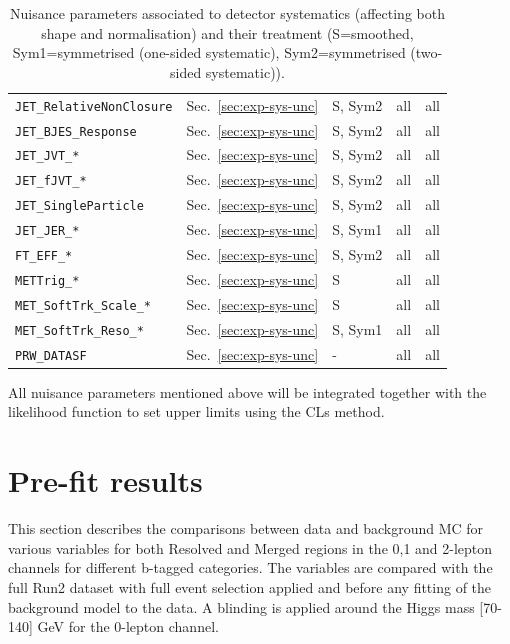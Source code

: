 \begin{table}[ht]
\begin{tabular}{|p{3.5cm}|p{2.0cm}|p{1.5cm}|p{2cm}|p{1.5cm}|}
        \texttt{JET\_RelativeNonClosure} & Sec.~\ref{sec:exp-sys-unc} & S, Sym2 & all & all \\
        \texttt{JET\_BJES\_Response} & Sec.~\ref{sec:exp-sys-unc} & S, Sym2 & all & all \\
        \texttt{JET\_JVT\_*} & Sec.~\ref{sec:exp-sys-unc} & S, Sym2 & all & all \\
        \texttt{JET\_fJVT\_*} & Sec.~\ref{sec:exp-sys-unc} & S, Sym2 & all & all \\
        \texttt{JET\_SingleParticle} & Sec.~\ref{sec:exp-sys-unc} & S, Sym2 & all & all \\
        \texttt{JET\_JER\_*} & Sec.~\ref{sec:exp-sys-unc} & S, Sym1 & all & all \\
        \texttt{FT\_EFF\_*} & Sec.~\ref{sec:exp-sys-unc} & S, Sym2 & all & all \\
        \texttt{METTrig\_*} & Sec.~\ref{sec:exp-sys-unc} & S & all & all \\
        \texttt{MET\_SoftTrk\_Scale\_*} & Sec.~\ref{sec:exp-sys-unc} & S & all & all \\
        \texttt{MET\_SoftTrk\_Reso\_*} & Sec.~\ref{sec:exp-sys-unc} & S, Sym1 & all & all \\
        \texttt{PRW\_DATASF} & Sec.~\ref{sec:exp-sys-unc} & - & all & all \\
        \hline
    \end{tabular}
    \caption{Nuisance parameters associated to detector systematics (affecting both shape and normalisation) and their treatment (S=smoothed, Sym1=symmetrised (one-sided systematic), Sym2=symmetrised (two-sided systematic)).}
    \label{tab:np-shape2}
\end{table}  

\par All nuisance parameters mentioned above will be integrated together with the likelihood function to set upper limits using the CLs method.

\section{Pre-fit results}

\par This section describes the comparisons between data and background MC for various variables for both
Resolved and Merged regions in the 0,1 and 2-lepton channels for different b-tagged categories. The variables are
compared with the full Run2 dataset with full event selection applied and before any fitting of the background
model to the data. A blinding is applied around the Higgs mass [70-140] GeV for the 0-lepton channel.


